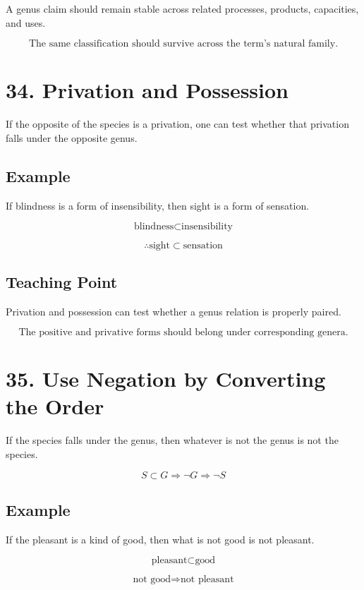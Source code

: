 \documentclass[12pt]{article}
\begin{document}
A genus claim should remain stable across related processes, products,
capacities, and uses.

\[
\boxed{
\text{The same classification should survive across the term's natural family.}
}
\]

\section*{34. Privation and Possession}

If the opposite of the species is a privation, one can test whether that
privation falls under the opposite genus.

\subsection*{Example}

If blindness is a form of insensibility, then sight is a form of sensation.

\[
\text{blindness} \subset \text{insensibility}
\]

\[
\therefore \text{sight} \subset \text{sensation}
\]

\subsection*{Teaching Point}

Privation and possession can test whether a genus relation is properly paired.

\[
\boxed{
\text{The positive and privative forms should belong under corresponding genera.}
}
\]

\section*{35. Use Negation by Converting the Order}

If the species falls under the genus, then whatever is not the genus is not the
species.

\[
S \subset G
\Rightarrow
\neg G \Rightarrow \neg S
\]

\subsection*{Example}

If the pleasant is a kind of good, then what is not good is not pleasant.

\[
\text{pleasant} \subset \text{good}
\]

\[
\text{not good} \Rightarrow \text{not pleasant}
\]
\end{document}
